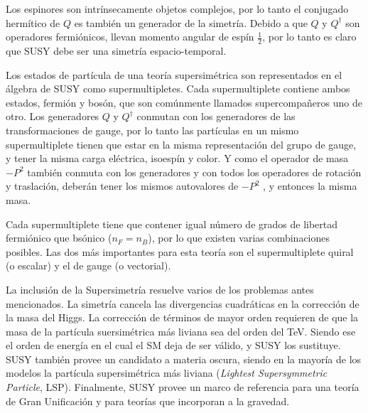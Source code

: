 Los espinores son intrínsecamente objetos complejos, por lo tanto el conjugado hermítico de $Q$ es también un generador de la simetría. Debido a que $Q$ y $Q^{\dagger}$ son operadores fermiónicos, llevan momento angular de espín $\frac{1}{2}$, por lo tanto es claro que SUSY debe ser una simetría espacio-temporal.

Los estados de partícula de una teoría supersimétrica son representados en el álgebra de SUSY como supermultipletes. Cada supermultiplete contiene ambos estados, fermión y bosón, que son comúnmente llamados supercompañeros uno de otro. Los generadores $Q$ y $Q^{\dagger}$ conmutan con los generadores de las transformaciones de gauge, por lo tanto las partículas en un mismo supermultiplete tienen que estar en la misma representación del grupo de gauge, y tener la misma carga eléctrica, isoespín y color. Y como el operador de masa $-P^{2}$ también conmuta con los generadores y con todos los operadores de rotación y traslación, deberán tener los mismos autovalores de $-P^{2}$ , y entonces la misma masa.

Cada supermultiplete tiene que contener igual número de grados de libertad fermiónico que bsónico ($n_{F}=n_{B}$), por lo que existen varias combinaciones posibles. Las dos más importantes para esta teoría son el supermultiplete quiral (o escalar) y el de gauge (o vectorial).



La inclusión de la Supersimetría resuelve varios de los problemas antes mencionados. La simetría cancela las divergencias cuadráticas en la corrección de la masa del Higgs. La corrección de términos de mayor orden requieren de que la masa de la partícula suersimétrica más liviana sea del orden del TeV. Siendo ese el orden de energía en el cual el SM deja de ser válido, y SUSY los sustituye. SUSY también provee un candidato a materia oscura, siendo en la mayoría de los modelos la partícula supersimétrica más liviana (\textit{Lightest Supersymmetric Particle}, LSP). Finalmente, SUSY provee un marco de referencia para una teoría de Gran Unificación y para teorías que incorporan a la gravedad. 



